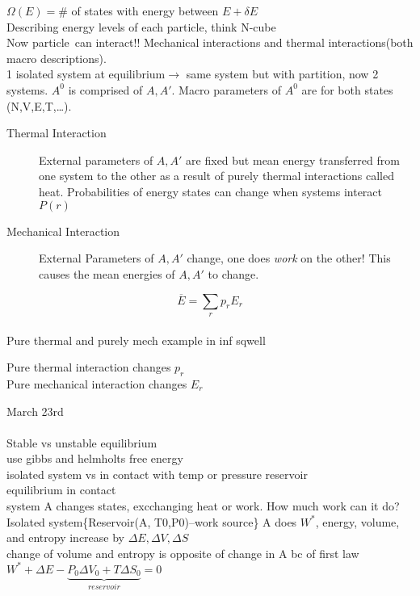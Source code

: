 \documentclass{article}
\def \pa {particle\ }
\begin{document}
    \begin{lecture}
        $\Omega(E)=\#$ of states with energy between $E+\delta E$
        \\
        Describing energy levels of each particle, think N-cube
        \\
        Now \pa can interact!! Mechanical interactions and thermal interactions(both macro descriptions). 
        \\
        1 isolated system at equilibrium$\rightarrow$ same system but with partition, now 2 systems. $A^0$ is comprised of $A,A'$. Macro parameters of $A^0$ are for both states (N,V,E,T,\ldots).
        \\
        \begin{description}
            \item [Thermal Interaction] External parameters of $A,A'$ are fixed but mean energy transferred from one system to the other as a result of purely thermal interactions called heat. Probabilities of energy states can change when systems interact $P(r)$
            \item [Mechanical Interaction] External Parameters of $A,A'$ change, one does \emph{work} on the other! This causes the mean energies of $A,A'$ to change. 
        \end{description}
        $$\overline{E}=\sum_rp_rE_r$$
        \\
        Pure thermal and purely mech example in inf sqwell
    \end{lecture}
\begin{lecture}[Jan 24]
    Pure thermal interaction changes $p_r$
    \\
    Pure mechanical interaction changes $E_r$
\end{lecture}
March 23rd
\\\\
Stable vs unstable equilibrium\\
use gibbs and helmholts free energy\\
isolated system vs in contact with temp or pressure reservoir\\
equilibrium in contact \\
system A changes states, excchanging heat or work. How much work can it do?\\
Isolated system\{Reservoir(A, T0,P0)--work source\}
A does $W^*$, energy, volume, and entropy increase by $\Delta E, \Delta V, \Delta S$ \\
change of volume and entropy is opposite of change in A bc of first law $W^*+\Delta E-\underbrace{P_0\Delta V_0+T\Delta S_0}_{reservoir}=0$
\end{document}
